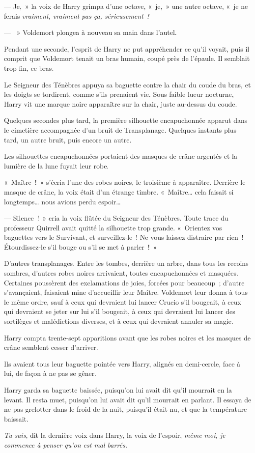 --- Je,~» la voix de Harry grimpa d'une octave, «~je,~» une autre octave, «~je ne ferais \emph{vraiment, vraiment pas ça, sérieusement~!}

--- ~» Voldemort plongea à nouveau sa main dans l'autel.

Pendant une seconde, l'esprit de Harry ne put appréhender ce qu'il voyait, puis il comprit que Voldemort tenait un bras humain, coupé près de l'épaule. Il semblait trop fin, ce bras.

Le Seigneur des Ténèbres appuya sa baguette contre la chair du coude du bras, et les doigts se tordirent, comme s'ils prenaient vie. Sous faible lueur nocturne, Harry vit une marque noire apparaître sur la chair, juste au-dessus du coude.

Quelques secondes plus tard, la première silhouette encapuchonnée apparut dans le cimetière accompagnée d'un bruit de Transplanage. Quelques instants plus tard, un autre bruit, puis encore un autre.

Les silhouettes encapuchonnées portaient des masques de crâne argentés et la lumière de la lune fuyait leur robe.

«~Maître~!~» s'écria l'une des robes noires, le troisième à apparaître. Derrière le masque de crâne, la voix était d'un étrange timbre. «~Maître… cela faisait si longtemps… nous avions perdu espoir…

--- Silence~!~» cria la voix flûtée du Seigneur des Ténèbres. Toute trace du professeur Quirrell avait quitté la silhouette trop grande. «~Orientez vos baguettes vers le Survivant, et surveillez-le~! Ne vous laissez distraire par rien~! Étourdissez-le s'il bouge ou s'il se met à parler~!~»

D'autres transplanages. Entre les tombes, derrière un arbre, dans tous les recoins sombres, d'autres robes noires arrivaient, toutes encapuchonnées et masquées. Certaines poussèrent des exclamations de joies, forcées pour beaucoup~; d'autre s'avançaient, faisaient mine d'accueillir leur Maître. Voldemort leur donna à tous le même ordre, sauf à ceux qui devraient lui lancer Crucio s'il bougeait, à ceux qui devraient se jeter sur lui s'il bougeait, à ceux qui devraient lui lancer des sortilèges et malédictions diverses, et à ceux qui devraient annuler sa magie.

Harry compta trente-sept apparitions avant que les robes noires et les masques de crâne semblent cesser d'arriver.

Ils avaient tous leur baguette pointée vers Harry, alignés en demi-cercle, face à lui, de façon à ne pas se gêner.

Harry garda sa baguette baissée, puisqu'on lui avait dit qu'il mourrait en la levant. Il resta muet, puisqu'on lui avait dit qu'il mourrait en parlant. Il essaya de ne pas grelotter dans le froid de la nuit, puisqu'il était nu, et que la température baissait.

\emph{Tu sais}, dit la dernière voix dans Harry, la voix de l'espoir, \emph{même moi, je commence à penser qu'on est mal barrés.}

